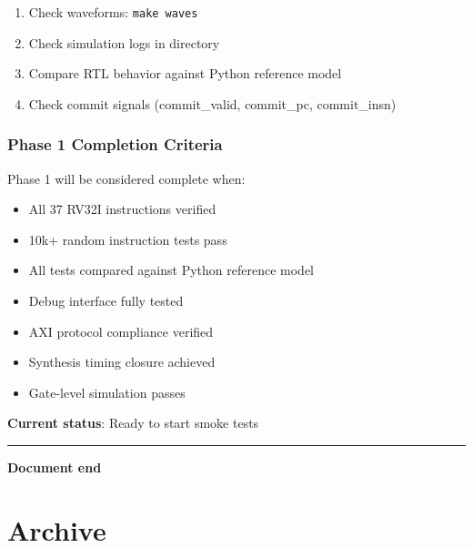 \begin{record}

\begin{enumerate}
\def\labelenumi{\arabic{enumi}.}
\tightlist
\item
  Check waveforms: \texttt{make\ waves}
\item
  Check simulation logs in  directory
\item
  Compare RTL behavior against Python reference model
\item
  Check commit signals (commit\_\allowbreak{}valid,
  commit\_\allowbreak{}pc, commit\_\allowbreak{}insn)
\end{enumerate}

\end{record}

\subsection{Phase 1 Completion Criteria}\label{cr:fix:cpu-verification-ready:phase-1-completion-criteria}

\begin{record}

Phase 1 will be considered complete when:

\begin{itemize}
\tightlist
\item
  \ok{} All 37 RV32I instructions verified
\item
  \ok{} 10k+ random instruction tests pass
\item
  \ok{} All tests compared against Python reference model
\item
  \ok{} Debug interface fully tested
\item
  \ok{} AXI protocol compliance verified
\item
  \ok{} Synthesis timing closure achieved
\item
  \ok{} Gate-level simulation passes
\end{itemize}

\textbf{Current status}: Ready to start smoke tests

\begin{center}\rule{0.5\linewidth}{0.5pt}\end{center}

\textbf{Document end}

\end{record}

\chapter{Archive}\label{cr:ch:archive}

